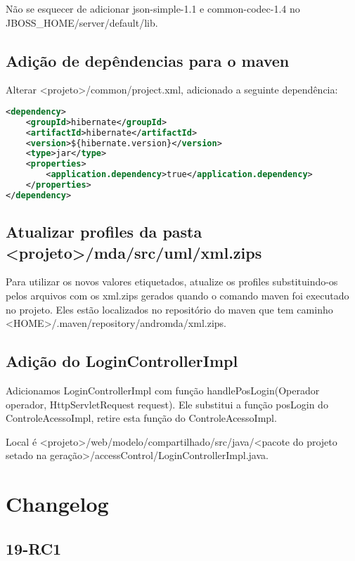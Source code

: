 Não se esquecer de adicionar json-simple-1.1 e common-codec-1.4 no
\textdollar{}JBOSS\_HOME/server/default/lib.

\section{Adição de depêndencias para o maven}
Alterar <projeto>/common/project.xml, adicionado a seguinte dependência:

\begin{framed}
\begin{lstlisting}[language=xml]
<dependency>
	<groupId>hibernate</groupId>
	<artifactId>hibernate</artifactId>
	<version>${hibernate.version}</version>
	<type>jar</type>
	<properties>
		<application.dependency>true</application.dependency>
	</properties>
</dependency>
\end{lstlisting}
\end{framed}

\section{Atualizar profiles da pasta <projeto>/mda/src/uml/xml.zips}
Para utilizar os novos valores etiquetados, atualize os profiles substituindo-os
pelos arquivos com os xml.zips gerados quando o comando maven foi executado no projeto. Eles estão localizados no repositório do maven que tem caminho <HOME>/.maven/repository/andromda/xml.zips.

\section{Adição do LoginControllerImpl}
Adicionamos LoginControllerImpl com função handlePosLogin(Operador operador,
HttpServletRequest request). Ele substitui a função posLogin do ControleAcessoImpl, retire esta função do ControleAcessoImpl.

Local é <projeto>/web/modelo/compartilhado/src/java/<pacote do projeto setado na
geração>/accessControl/LoginControllerImpl.java.


\chapter{Changelog}

\section{19-RC1}

